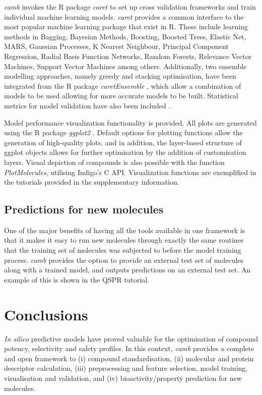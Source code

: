 \documentclass{bioinfo}
\begin{document}
{\it camb} invokes the R package {\it caret} to set up cross validation frameworks and
train individual machine learning models. {\it caret} provides a common interface to the most popular machine learning package that exist in R.
These include learning methods in Bagging, Bayesian Methods, Boosting, Boosted Trees, Elastic Net, MARS, Gaussian Processes, K Nearest Neighbour,
 Principal Component Regression, Radial Basis Function Networks, Random Forests, Relevance Vector Machines, Support Vector Machines among others.
Additionally, two ensemble modelling approaches, namely greedy and stacking optimisation,
have been integrated from the R package {\it caretEnsemble} \citep{caretEnsemble}, which allow a combination of models to be used 
allowing for more accurate models to be built.
Statistical metrics for model validation have also been included \citep{beware}.

Model performance visualization functionality is provided. All plots are generated using the R package {\it ggplot2} \citep{ggplot2}.
Default options for plotting functions allow the generation of high-quality plots,
and in addition, the layer-based structure of ggplot objects allows for further optimisation
by the addition of customisation layers.  
Visual depiction of compounds is also possible with the function {\it PlotMolecules},
utilising Indigo's C API. Visualization functions are exemplified in the tutorials provided in the supplementary information.

\subsection{Predictions for new molecules}
One of the major benefits of having all the tools available in one framework is that it makes it easy to run new molecules through exactly the same routines that the training set of molecules was subjected to before the model training process. {\it camb} provides the option to provide an external test set of molecules along with a trained model, and outputs predictions on an external test set. An example of this is shown in the QSPR tutorial.

\section{Conclusions}
{\it In silico} predictive models have proved valuable
for the optimisation of compound potency, selectivity and safety profiles.
In this context, {\it camb} provides a complete and open framework
to (i) compound standardisation, (ii) molecular and protein descriptor calculation,
(iii) preprocessing and feature selection, model training, visualisation and validation, and 
(iv) bioactivity/property prediction for new molecules.
\end{document}
